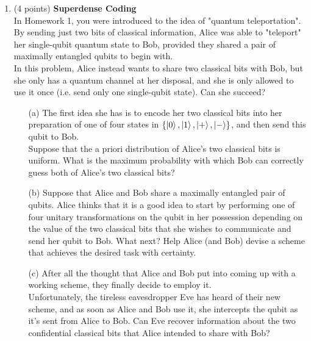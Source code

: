 \documentclass[12pt]{article}
\begin{document}
\begin{enumerate}
\item (4 points) \textbf{Superdense Coding}\\
In Homework 1, you were introduced to the idea of "quantum teleportation". By sending just two bits of classical information, Alice was able to "teleport" her single-qubit quantum state to Bob, provided they shared a pair of maximally entangled qubits to begin with. \\
In this problem, Alice instead wants to share two classical bits with Bob, but she only has a quantum channel at her disposal, and she is only allowed to use it once (i.e. send only one single-qubit state). Can she succeed? \\
\begin{enumerate}
\item[(a)] The first idea she has is to encode her two classical bits into her preparation of one of four states in $\{ \ket{0}, \ket{1}, \ket{+}, \ket{-}\}$, and then send this qubit to Bob. \\
Suppose that the a priori distribution of Alice's two classical bits is uniform. What is the maximum probability with which Bob can correctly guess both of Alice's two classical bits?\\
\item[(b)] Suppose that Alice and Bob share a maximally entangled pair of qubits. Alice thinks that it is a good idea to start by performing one of four unitary transformations on the qubit in her possession depending on the value of the two classical bits that she wishes to communicate and send her qubit to Bob. What next? Help Alice (and Bob) devise a scheme that achieves the desired task with certainty.\\
\item[(c)] After all the thought that Alice and Bob put into coming up with a working scheme, they finally decide to employ it.\\
Unfortunately, the tireless eavesdropper Eve has heard of their new scheme, and as soon as Alice and Bob use it, she intercepts the qubit as it's sent from Alice to Bob. Can Eve recover information about the two confidential classical bits that Alice intended to share with Bob?\\
\end{enumerate}



\end{enumerate}
\end{document}
